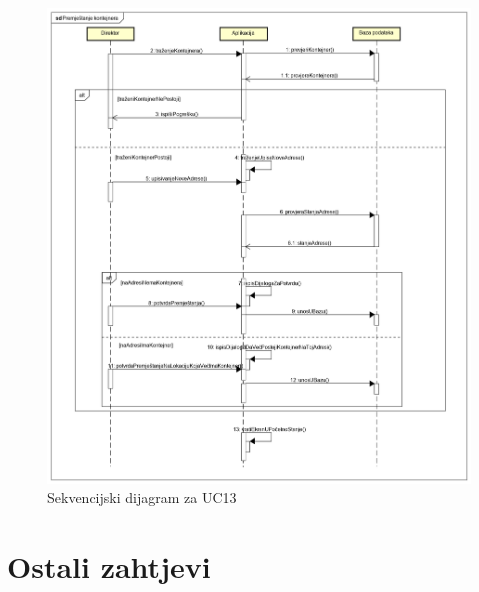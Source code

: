 			\begin{figure}
				\centering
				\includegraphics[width=1.1\linewidth]{slike/Sekvencijski dijagram za premjestanje kontejnera.png}
				\caption{Sekvencijski dijagram za UC13}
				\label{fig:sekvencijski-dijagram-za-premjestanje-kontejnera}
			\end{figure}
			
			\clearpage	 

			\section{Ostali zahtjevi}

